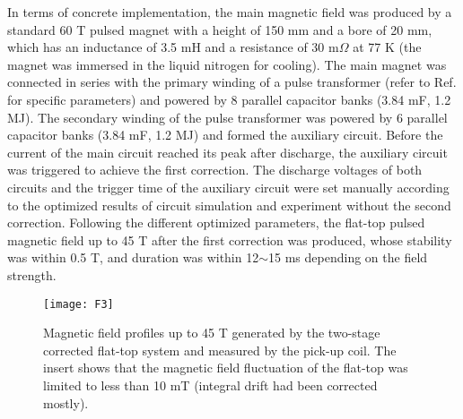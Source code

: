 \documentclass[lettersize,journal]{IEEEtran}
\begin{document}
In terms of concrete implementation, the main magnetic field was produced by a standard 60 T pulsed magnet with a height of 150 mm and a bore of 20 mm, which has an inductance of 3.5 mH and a resistance of 30 m$\Omega$ at 77 K (the magnet was immersed in the liquid nitrogen for cooling). The main magnet was connected in series with the primary winding of a pulse transformer (refer to Ref. \cite{ref28} for specific parameters) and powered by 8 parallel capacitor banks (3.84 mF, 1.2 MJ). The secondary winding of the pulse transformer was powered by 6 parallel capacitor banks (3.84 mF, 1.2 MJ) and formed the auxiliary circuit. Before the current of the main circuit reached its peak after discharge, the auxiliary circuit was triggered to achieve the first correction. The discharge voltages of both circuits and the trigger time of the auxiliary circuit were set manually according to the optimized results of circuit simulation and experiment without the second correction. Following the different optimized parameters, the flat-top pulsed magnetic field up to 45 T after the first correction was produced, whose stability was within 0.5 T, and duration was within 12$\sim$15 ms depending on the field strength.

\begin{figure}[t]
\centering
\texttt{[image: F3]}
\caption{Magnetic field profiles up to 45 T generated by the two-stage corrected flat-top system and measured by the pick-up coil. The insert shows that the magnetic field fluctuation of the flat-top was limited to less than 10 mT (integral drift had been corrected mostly).}
\end{figure}
\end{document}
